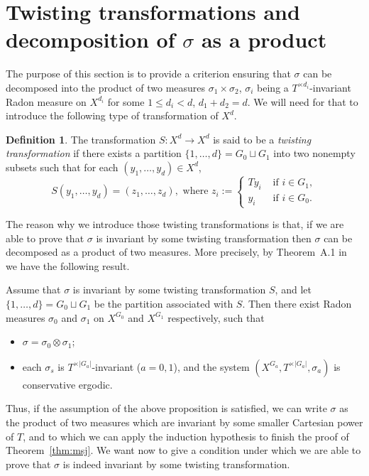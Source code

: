 \documentclass[10pt]{amsart}
\theoremstyle{definition}\newtheorem{defi}[theo]{Definition}\newtheorem{rema}[theo]{Remark}\newtheorem{exam}[theo]{Example}\newtheorem{exem}[theo]{Example}\newtheorem{nota}[theo]{Notation}
\newcommand{\egdef}{:=}
\begin{document}
\section{Twisting transformations and decomposition of \texorpdfstring{$\sigma$}{sigma} as a product}
\label{sec:twist}

The purpose of this section is to provide a criterion ensuring that $\sigma$ can be decomposed into the product of two measures $\sigma_1\times\sigma_2$, $\sigma_i$ being a $T^{\times d_i}$-invariant Radon measure on $X^{d_i}$ for some $1\le d_i<d$, $d_1+d_2=d$. We will need for that to introduce the following type of transformation of $X^d$.

\begin{defi}\label{def:twist}
The transformation $S:X^d\to X^d$ is said to be a \emph{twisting transformation} if there exists a partition $\{1,\ldots,d\}=G_0\sqcup G_1$ into two nonempty subsets such that for each $(y_1,\ldots,y_d)\in X^d$,
\[
S(y_1,\ldots, y_d)= (z_1,\ldots,z_d),\text{ where } z_i\egdef
\begin{cases}
T y_i &\text{ if }i\in G_1, \\
y_i &\text{ if }i\in G_0.
\end{cases}
\]
\end{defi}

The reason why we introduce those twisting transformations is that, if we are able to prove that $\sigma$ is invariant by some twisting transformation then $\sigma$ can be decomposed as a product of two measures. More precisely, by Theorem~A.1 in~\cite{ChaconInfinite} we have the following result.

\begin{prop}\label{prop:product}
Assume that $\sigma$ is invariant by some twisting transformation $S$, and let $\{1,\ldots,d\}=G_0\sqcup G_1$ be the partition associated with $S$. Then there exist Radon measures $\sigma_0$ and $\sigma_1$ on $X^{G_0}$ and $X^{G_1}$ respectively, such that
\begin{itemize}
\item $\sigma=\sigma_0\otimes\sigma_1$;
\item each $\sigma_s$ is $T^{\times |G_a|}$-invariant ($a=0,1$), and the system $(X^{G_a},T^{\times |G_a|},\sigma_a)$ is conservative ergodic.
\end{itemize}
\end{prop}

Thus, if the assumption of the above proposition is satisfied, we can write $\sigma$ as the product of two measures which are invariant by some smaller Cartesian power of $T$, and to which we can apply the induction hypothesis to finish the proof of Theorem~\ref{thm:msj}. We want now to give a condition under which we are able to prove that $\sigma$ is indeed invariant by some twisting transformation.
\end{document}
